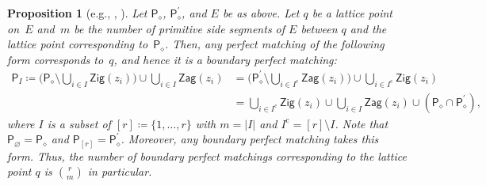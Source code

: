 \documentclass[10pt,a4paper]{amsart}
\numberwithin{equation}{section}
\newtheorem{Proposition}[Theorem]{Proposition}
\theoremstyle{definition}
\newcommand{\rmc}{\mathrm{c}}
\newcommand{\sfP}{\mathsf{P}}
\newcommand{\Zig}{\mathsf{Zig}}
\newcommand{\Zag}{\mathsf{Zag}}
\newcommand{\cPM}{\sfP_\diamond}
\begin{document}
\begin{Proposition}[{e.g., \cite[Proposition~4.35]{Bro_dimer}, \cite[Corollary~3.8]{Gul}}]
\label{char_bound}
Let $\cPM$, $\cPM^\prime$, and $E$ be as above.
Let $q$ be a lattice point on~$E$ and~$m$ be the number of primitive side segments of $E$ between $q$ and the lattice point corresponding to~$\cPM$.
Then, any perfect matching of the following form corresponds to~$q$, and hence it is a boundary perfect matching:
\begin{align*}
\sfP_I\coloneqq\biggl(\cPM{\setminus}\bigcup_{i\in I}\Zig(z_i)\biggr)\cup\bigcup_{i\in I}\Zag(z_i)
&=\biggl(\cPM^\prime{\setminus}\bigcup_{i\in I^\rmc}\Zag(z_i)\biggr)\cup\bigcup_{i\in I^\rmc}\Zig(z_i)\\
&=\bigcup_{i\in I^\rmc}\Zig(z_i)\cup\bigcup_{i\in I}\Zag(z_i)\cup (\cPM\cap\cPM^\prime ),
\end{align*}
where $I$ is a subset of $[r]\coloneqq\{1, \dots, r\}$ with $m=|I|$ and $I^\rmc=[r]{\setminus}I$.
Note that $\sfP_\varnothing=\cPM$ and $\sfP_{[r]}=\cPM^\prime$.
Moreover, any boundary perfect matching takes this form.
Thus, the number of boundary perfect matchings corresponding to the lattice point $q$ is $\binom{r}{m}$ in particular.
\end{Proposition}
\end{document}
